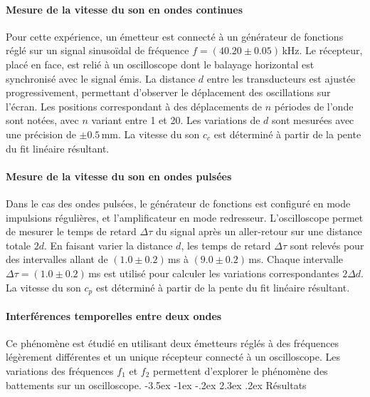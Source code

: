 \documentclass[a4paper, 12pt,oneside]{article}
\makeatletter
\renewcommand{\section}{\@startsection {section}{1}{\z@}%
             {-3.5ex \@plus -1ex \@minus -.2ex}%
             {2.3ex \@plus.2ex}%
             {\normalfont\normalsize\bfseries}}
\makeatother
\begin{document}
\vspace{-0.2cm}
\paragraph{Mesure de la vitesse du son en ondes continues}

Pour cette expérience, un émetteur est connecté à un générateur de fonctions réglé sur un signal sinusoïdal de fréquence $f = (40.20 \pm 0.05)$\,kHz. Le récepteur, placé en face, est relié à un oscilloscope dont le balayage horizontal est synchronisé avec le signal émis. La distance $d$ entre les transducteurs est ajustée progressivement, permettant d’observer le déplacement des oscillations sur l’écran. Les positions correspondant à des déplacements de $n$ périodes de l’onde sont notées, avec $n$ variant entre 1 et 20. Les variations de $d$ sont mesurées avec une précision de $\pm 0.5$\,mm. La vitesse du son $c_c$ est déterminé à partir de la pente du fit linéaire résultant.

\paragraph{Mesure de la vitesse du son en ondes pulsées}

Dans le cas des ondes pulsées, le générateur de fonctions est configuré en mode impulsions régulières, et l’amplificateur en mode redresseur. L’oscilloscope permet de mesurer le temps de retard $\Delta \tau$ du signal après un aller-retour sur une distance totale $2d$. En faisant varier la distance $d$, les temps de retard $\Delta \tau$ sont relevés pour des intervalles allant de $(1.0 \pm 0.2)$\,ms à $(9.0 \pm 0.2)$\,ms. Chaque intervalle $\Delta \tau = (1.0 \pm 0.2)$\,ms est utilisé pour calculer les variations correspondantes $2\Delta d$. La vitesse du son $c_p$ est déterminé à partir de la pente du fit linéaire résultant.

\paragraph{Interférences temporelles entre deux ondes}

Ce phénomène est étudié en utilisant deux émetteurs réglés à des fréquences légèrement différentes et un unique récepteur connecté à un oscilloscope. Les variations des fréquences $f_1$ et $f_2$ permettent d’explorer le phénomène des battements sur un oscilloscope.
\vspace{-0.5cm}
\section{Résultats}
\end{document}
